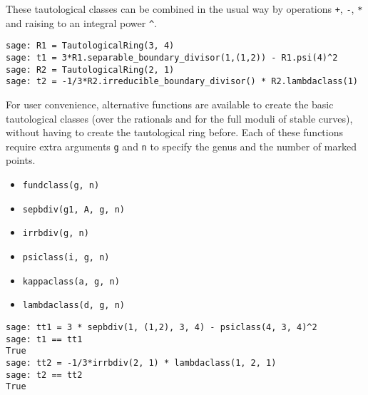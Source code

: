 \documentclass[11pt]{article}
\begin{document}
These tautological classes can be combined in the usual way by operations \verb|+|, \verb|-|, \verb|*| and raising to an integral power \verb|^|.
\begin{lstlisting}
sage: R1 = TautologicalRing(3, 4)
sage: t1 = 3*R1.separable_boundary_divisor(1,(1,2)) - R1.psi(4)^2
sage: R2 = TautologicalRing(2, 1)
sage: t2 = -1/3*R2.irreducible_boundary_divisor() * R2.lambdaclass(1)
\end{lstlisting}
For user convenience, alternative functions are available to create the basic tautological classes (over the rationals and for the full moduli of stable curves), without having to create the tautological ring before. Each of these functions require extra arguments \verb|g| and \verb|n| to specify the genus and the number of marked points.
\begin{itemize}
 \item \verb|fundclass(g, n)|
 \item \verb|sepbdiv(g1, A, g, n)|
 \item \verb|irrbdiv(g, n)|
 \item \verb|psiclass(i, g, n)|
 \item \verb|kappaclass(a, g, n)|
 \item \verb|lambdaclass(d, g, n)|
\end{itemize}
\begin{lstlisting}
sage: tt1 = 3 * sepbdiv(1, (1,2), 3, 4) - psiclass(4, 3, 4)^2
sage: t1 == tt1
True
sage: tt2 = -1/3*irrbdiv(2, 1) * lambdaclass(1, 2, 1)
sage: t2 == tt2
True
\end{lstlisting}
\end{document}
